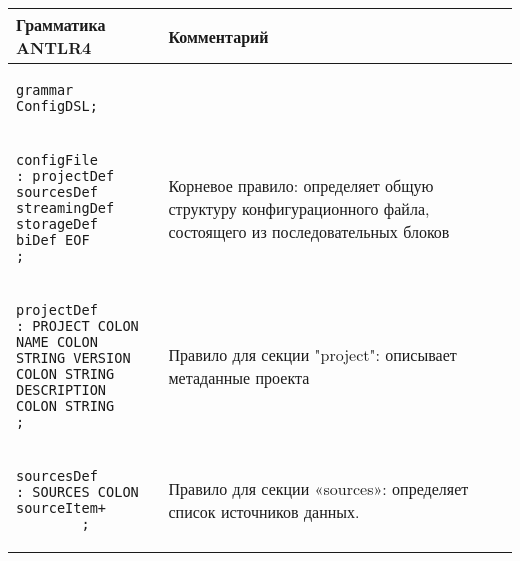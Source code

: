 \begin{longtable}{|p{3in}|p{3in}|}
    \hline
    Грамматика ANTLR4            & Комментарий                                                                                                                                                           \\ \hline
    \begin{minipage}{2.6in}
        \begin{verbatim}
grammar ConfigDSL;
        \end{verbatim}
    \end{minipage}      &                                                                                                                                                                               \\ \hline
    \begin{minipage}{3in}
        \begin{verbatim}
configFile
: projectDef
sourcesDef
streamingDef
storageDef
biDef EOF
;
\end{verbatim}
    \end{minipage}        &
    \begin{minipage}{3in}Корневое правило: определяет общую структуру конфигурационного файла, состоящего из последовательных блоков\end{minipage}                                                       \\ \hline
    \begin{minipage}{2.6in}
        \begin{verbatim}
projectDef
: PROJECT COLON NAME COLON 
STRING VERSION COLON STRING 
DESCRIPTION COLON STRING
;
    \end{verbatim}
    \end{minipage} &
    \begin{minipage}{3in}Правило для секции "project": описывает метаданные проекта\end{minipage}                                                                                                        \\ \hline
    \begin{minipage}{3in}
        \begin{verbatim}
sourcesDef
: SOURCES COLON 
sourceItem+
        ;
    \end{verbatim}
    \end{minipage}
                                 &
    \begin{minipage}{2.6in}
        Правило для секции «sources»: определяет список источников данных.
    \end{minipage}
    \\ \hline


\end{longtable}
